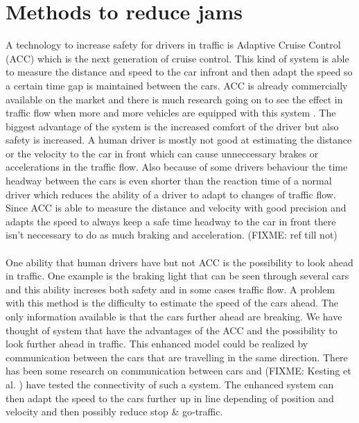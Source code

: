 \section{Methods to reduce jams}
A technology to increase safety for drivers in traffic is Adaptive Cruise
Control (ACC) which is the next generation of cruise control. This kind of
system is able to measure the distance and speed to the car infront and then
adapt the speed so a certain time gap is maintained between the cars. ACC
is already commercially available on the market and there is much research
going on to see the effect in traffic flow when more and more vehicles are
equipped with this system \cite{acc}. The biggest advantage of the system
is the increased comfort of the driver but also safety is increased. A human
driver is mostly not good at estimating the distance or the velocity to the car
in front which can cause unneccessary brakes or accelerations in the traffic
flow. Also because of some drivers behaviour the time headway between the
cars is even shorter than the reaction time of a normal driver which reduces
the ability of a driver to adapt to changes of traffic flow. Since ACC is
able to measure the distance and velocity with good precision and adapts
the speed to always keep a safe time headway to the car in front there isn't
neccessary to do as much braking and acceleration. (FIXME: ref till not)\\\\

One ability that human drivers have but not ACC is the possibility to look
ahead in traffic. One example is the braking light that can be seen through
several cars and this ability increses both safety and in some cases traffic
flow. A problem with this method is the difficulty to estimate the speed of the
cars ahead. The only information available is that the cars further ahead are
breaking. We have thought of system that have the advantages of the ACC and
the possibility to look further ahead in traffic. This enhanced model could
be realized by communication between the cars that are travelling in the same
direction. There has been some research on communication between cars and
(FIXME: Kesting et al. ) have tested the connectivity of such a system. The
enhanced system can then adapt the speed to the cars further up in line
depending of position and velocity and then possibly reduce stop \& go-traffic.
